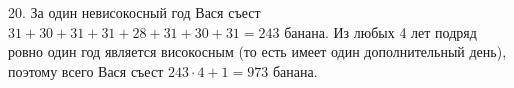 20. За один невисокосный год Вася съест $31+30+31+31+28+31+30+31=243$ банана. Из любых 4 лет подряд ровно один год является високосным (то есть имеет один дополнительный день), поэтому всего Вася съест $243\cdot4+1=973$ банана.\\
